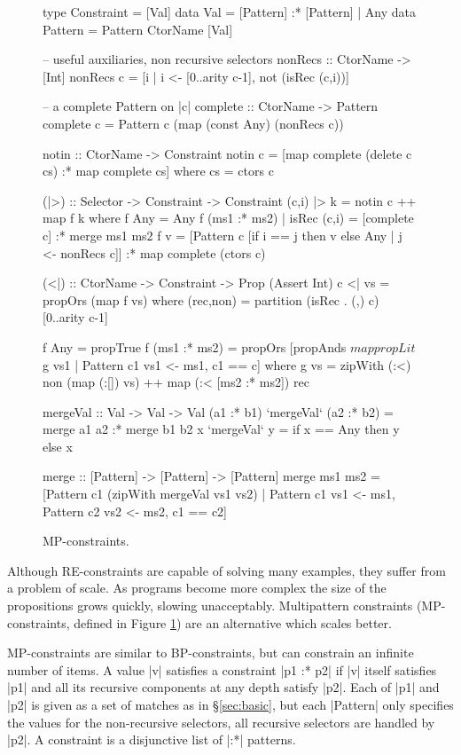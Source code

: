 \begin{figure}
\begin{code}
type Constraint  =  [Val]
data Val         =  [Pattern] :* [Pattern] |  Any
data Pattern     =  Pattern CtorName [Val]

-- useful auxiliaries, non recursive selectors
nonRecs :: CtorName -> [Int]
nonRecs c = [i | i <- [0..arity c-1], not (isRec (c,i))]

-- a complete Pattern on |c|
complete :: CtorName -> Pattern
complete c = Pattern c (map (const Any) (nonRecs c))

notin :: CtorName -> Constraint
notin c = [map complete (delete c cs) :* map complete cs]
    where cs = ctors c

(|>) :: Selector -> Constraint -> Constraint
(c,i) |> k = notin c ++ map f k
    where
    f Any = Any
    f (ms1 :* ms2) | isRec (c,i) = [complete c] :* merge ms1 ms2
    f v =  [Pattern c [if i == j then v else Any | j <- nonRecs c]]
           :* map complete (ctors c)

(<|) :: CtorName -> Constraint -> Prop (Assert Int)
c <| vs = propOrs (map f vs)
    where
    (rec,non) = partition (isRec . (,) c) [0..arity c-1]

    f Any = propTrue
    f (ms1 :* ms2) =  propOrs  [propAnds $ map propLit $ g vs1
                               | Pattern c1 vs1 <- ms1, c1 == c]
        where g vs =  zipWith (:<) non (map (:[]) vs) ++
                      map (:< [ms2 :* ms2]) rec

mergeVal :: Val -> Val -> Val
(a1 :* b1)  `mergeVal`  (a2 :* b2)  = merge a1 a2 :* merge b1 b2
x           `mergeVal`  y           = if x == Any then y else x

merge :: [Pattern] -> [Pattern] -> [Pattern]
merge  ms1 ms2 = [Pattern c1 (zipWith mergeVal vs1 vs2) |
       Pattern c1 vs1 <- ms1, Pattern c2 vs2 <- ms2, c1 == c2]
\end{code}
\caption{MP-constraints.}
\label{fig:enumeration}
\end{figure}

Although RE-constraints are capable of solving many examples, they suffer from a problem of scale. As programs become more complex the size of the propositions grows quickly, slowing \catch{} unacceptably. Multipattern constraints (MP-constraints, defined in Figure \ref{fig:enumeration}) are an alternative which scales better.

MP-constraints are similar to BP-constraints, but can constrain an infinite number of items. A value |v| satisfies a constraint |p1 :* p2| if |v| itself satisfies |p1| and all its recursive components at any depth satisfy |p2|. Each of |p1| and |p2| is given as a set of matches as in \S\ref{sec:basic}, but each |Pattern| only specifies the values for the non-recursive selectors, all recursive selectors are handled by |p2|. A constraint is a disjunctive list of |:*| patterns.

